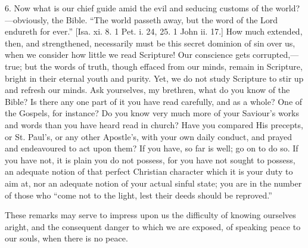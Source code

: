 6. Now what is our chief guide amid the evil and
seducing customs of the world?—obviously, the Bible.
``The world passeth away, but the word of the Lord
endureth for ever.'' [Isa. xi. 8. 1 Pet. i. 24, 25. 1
John ii. 17.] How much extended, then, and strengthened,
necessarily must be this secret dominion of sin over us,
when we consider how little we read Scripture! Our
conscience gets corrupted,—true; but the words of
truth, though effaced from our minds, remain in
Scripture, bright in their eternal youth and purity. Yet,
we do not study Scripture to stir up and refresh our
minds. Ask yourselves, my brethren, what do you know of
the Bible? Is there any one part of it you have read
carefully, and as a whole? One of the Gospels, for
instance? Do you know very much more of your Saviour's
works and words than you have heard read in church? Have
you compared His precepts, or St. Paul's, or any other
Apostle's, with your own daily conduct, and prayed and
endeavoured to act upon them? If you have, so far is
well; go on to do so. If you have not, it is plain you do
not possess, for you have not sought to possess, an
adequate notion of that perfect Christian character which
it is your duty to aim at, nor an adequate notion of your
actual sinful state; you are in the number of those who
``come not to the light, lest their deeds should be
reproved.''

These remarks may serve to impress upon us the
difficulty of knowing ourselves aright, and the
consequent danger to which we are exposed, of speaking
peace to our souls, when there is no peace.

